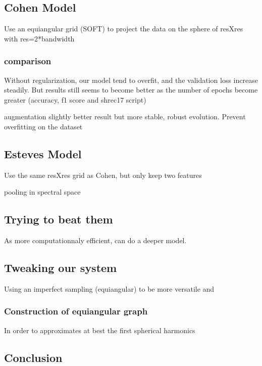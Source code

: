 \documentclass[11pt]{report}
\begin{document}
\subsection{Cohen Model}
Use an equiangular grid (SOFT) to project the data on the sphere of resXres with res=2*bandwidth

\subsubsection{comparison}
Without regularization, our model tend to overfit, and the validation loss increase steadily. But results still seems to become better as the number of epochs become greater (accuracy, f1 score and shrec17 script)

augmentation slightly better result but more stable, robust evolution. Prevent overfitting on the dataset
\subsection{Esteves Model}
Use the same resXres grid as Cohen, but only keep two features

pooling in spectral space
\subsection{Trying to beat them}
As more computationnaly efficient, can do a deeper model.

\subsection{Tweaking our system}
Using an imperfect sampling (equiangular) to be more versatile and 
\subsubsection{Construction of equiangular graph}
In order to approximates at best the first spherical harmonics
\subsection{Conclusion}
\end{document}
